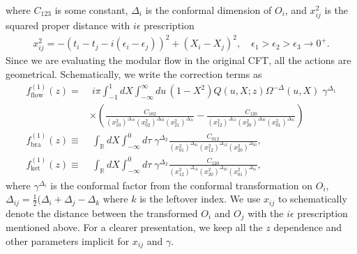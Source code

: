 \documentclass[a4paper,11pt]{article}
\theoremstyle{definition}
\begin{document}
where $C_{123}$ is some constant, $\Delta_i$ is the conformal dimension of $O_i$, and $x_{ij}^2$ is the squared proper distance with $i\epsilon$ prescription
\begin{gather}
    x_{ij}^2 = -(t_i-t_j-i(\epsilon_i-\epsilon_j))^2 + (X_i-X_j)^2, \quad \epsilon_1 > \epsilon_2 > \epsilon_3 \to 0^+.
\end{gather}
Since we are evaluating the modular flow in the original CFT, all the actions are geometrical. Schematically, we write the correction terms as
\begin{align}
    f^{(1)}_{\text{flow}}(z) =&\; i\pi  \int_{-1}^1 dX \int_{-\infty}^{\infty} du \, (1-X^2)Q(u,X;z) \Omega^{-\Delta}(u,X) \;\gamma^{\Delta_1} \nonumber\\
    &\times\left(\frac{C_{102}}{(x_{10}^2)^{\Delta_{10}}(x_{02}^2)^{\Delta_{02}}(x_{21}^2)^{\Delta_{21}}} -\frac{C_{120}}{(x_{12}^2)^{\Delta_{12}}(x_{20}^2)^{\Delta_{20}}(x_{01}^2)^{\Delta_{01}}}\right) \\
    f^{(1)}_{\text{bra}}(z) \equiv&\; \int_\mathbb{R} dX \int_{-\infty}^{0} d\tau \;\gamma^{\Delta_2} \frac{C_{012}}{(x_{01}^2)^{\Delta_{01}}(x_{12}^2)^{\Delta_{12}}(x_{20}^2)^{\Delta_{20}}},\\
    f^{(1)}_{\text{ket}}(z) \equiv&\; \int_\mathbb{R} dX \int_{-\infty}^{0} d\tau \; \gamma^{\Delta_2}\frac{C_{120}}{(x_{12}^2)^{\Delta_{12}}(x_{20}^2)^{\Delta_{20}}(x_{01}^2)^{\Delta_{01}}},
\end{align}
where $\gamma^{\Delta_i}$ is the conformal factor from the conformal transformation on $O_i$, $\Delta_{ij} = \frac{1}{2}(\Delta_i+\Delta_j - \Delta_k$ where $k$ is the leftover index. We use $x_{ij}$ to schematically denote the distance between the transformed $O_i$ and $O_j$ with the $i\epsilon$ prescription mentioned above. For a clearer presentation, we keep all the $z$ dependence and other parameters implicit for $x_{ij}$ and $\gamma$. 
\end{document}
